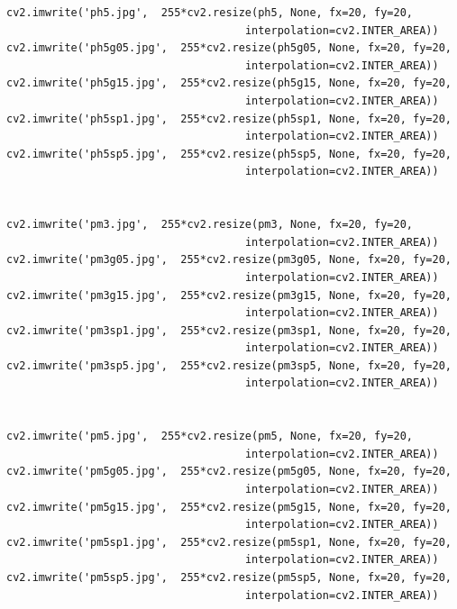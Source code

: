 \documentclass{article}
\begin{document}
\begin{verbatim}
cv2.imwrite('ph5.jpg',  255*cv2.resize(ph5, None, fx=20, fy=20,
                                     interpolation=cv2.INTER_AREA))
cv2.imwrite('ph5g05.jpg',  255*cv2.resize(ph5g05, None, fx=20, fy=20,
                                     interpolation=cv2.INTER_AREA))
cv2.imwrite('ph5g15.jpg',  255*cv2.resize(ph5g15, None, fx=20, fy=20,
                                     interpolation=cv2.INTER_AREA))
cv2.imwrite('ph5sp1.jpg',  255*cv2.resize(ph5sp1, None, fx=20, fy=20,
                                     interpolation=cv2.INTER_AREA))
cv2.imwrite('ph5sp5.jpg',  255*cv2.resize(ph5sp5, None, fx=20, fy=20,
                                     interpolation=cv2.INTER_AREA))


cv2.imwrite('pm3.jpg',  255*cv2.resize(pm3, None, fx=20, fy=20,
                                     interpolation=cv2.INTER_AREA))
cv2.imwrite('pm3g05.jpg',  255*cv2.resize(pm3g05, None, fx=20, fy=20,
                                     interpolation=cv2.INTER_AREA))
cv2.imwrite('pm3g15.jpg',  255*cv2.resize(pm3g15, None, fx=20, fy=20,
                                     interpolation=cv2.INTER_AREA))
cv2.imwrite('pm3sp1.jpg',  255*cv2.resize(pm3sp1, None, fx=20, fy=20,
                                     interpolation=cv2.INTER_AREA))
cv2.imwrite('pm3sp5.jpg',  255*cv2.resize(pm3sp5, None, fx=20, fy=20,
                                     interpolation=cv2.INTER_AREA))


cv2.imwrite('pm5.jpg',  255*cv2.resize(pm5, None, fx=20, fy=20,
                                     interpolation=cv2.INTER_AREA))
cv2.imwrite('pm5g05.jpg',  255*cv2.resize(pm5g05, None, fx=20, fy=20,
                                     interpolation=cv2.INTER_AREA))
cv2.imwrite('pm5g15.jpg',  255*cv2.resize(pm5g15, None, fx=20, fy=20,
                                     interpolation=cv2.INTER_AREA))
cv2.imwrite('pm5sp1.jpg',  255*cv2.resize(pm5sp1, None, fx=20, fy=20,
                                     interpolation=cv2.INTER_AREA))
cv2.imwrite('pm5sp5.jpg',  255*cv2.resize(pm5sp5, None, fx=20, fy=20,
                                     interpolation=cv2.INTER_AREA))


\end{verbatim}
\end{document}
